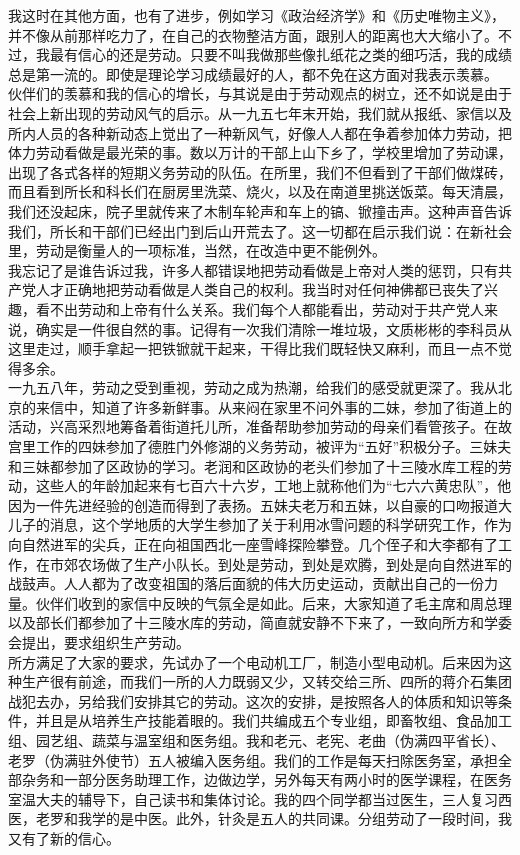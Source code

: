 我这时在其他方面，也有了进步，例如学习《政治经济学》和《历史唯物主义》，并不像从前那样吃力了，在自己的衣物整洁方面，跟别人的距离也大大缩小了。不过，我最有信心的还是劳动。只要不叫我做那些像扎纸花之类的细巧活，我的成绩总是第一流的。即使是理论学习成绩最好的人，都不免在这方面对我表示羡慕。\\

伙伴们的羡慕和我的信心的增长，与其说是由于劳动观点的树立，还不如说是由于社会上新出现的劳动风气的启示。从一九五七年末开始，我们就从报纸、家信以及所内人员的各种新动态上觉出了一种新风气，好像人人都在争着参加体力劳动，把体力劳动看做是最光荣的事。数以万计的干部上山下乡了，学校里增加了劳动课，出现了各式各样的短期义务劳动的队伍。在所里，我们不但看到了干部们做煤砖，而且看到所长和科长们在厨房里洗菜、烧火，以及在南道里挑送饭菜。每天清晨，我们还没起床，院子里就传来了木制车轮声和车上的镐、锨撞击声。这种声音告诉我们，所长和干部们已经出门到后山开荒去了。这一切都在启示我们说：在新社会里，劳动是衡量人的一项标准，当然，在改造中更不能例外。\\

我忘记了是谁告诉过我，许多人都错误地把劳动看做是上帝对人类的惩罚，只有共产党人才正确地把劳动看做是人类自己的权利。我当时对任何神佛都已丧失了兴趣，看不出劳动和上帝有什么关系。我们每个人都能看出，劳动对于共产党人来说，确实是一件很自然的事。记得有一次我们清除一堆垃圾，文质彬彬的李科员从这里走过，顺手拿起一把铁锨就干起来，干得比我们既轻快又麻利，而且一点不觉得多余。\\

一九五八年，劳动之受到重视，劳动之成为热潮，给我们的感受就更深了。我从北京的来信中，知道了许多新鲜事。从来闷在家里不问外事的二妹，参加了街道上的活动，兴高采烈地筹备着街道托儿所，准备帮助参加劳动的母亲们看管孩子。在故宫里工作的四妹参加了德胜门外修湖的义务劳动，被评为“五好”积极分子。三妹夫和三妹都参加了区政协的学习。老润和区政协的老头们参加了十三陵水库工程的劳动，这些人的年龄加起来有七百六十六岁，工地上就称他们为“七六六黄忠队”，他因为一件先进经验的创造而得到了表扬。五妹夫老万和五妹，以自豪的口吻报道大儿子的消息，这个学地质的大学生参加了关于利用冰雪问题的科学研究工作，作为向自然进军的尖兵，正在向祖国西北一座雪峰探险攀登。几个侄子和大李都有了工作，在市郊农场做了生产小队长。到处是劳动，到处是欢腾，到处是向自然进军的战鼓声。人人都为了改变祖国的落后面貌的伟大历史运动，贡献出自己的一份力量。伙伴们收到的家信中反映的气氛全是如此。后来，大家知道了毛主席和周总理以及部长们都参加了十三陵水库的劳动，简直就安静不下来了，一致向所方和学委会提出，要求组织生产劳动。\\

所方满足了大家的要求，先试办了一个电动机工厂，制造小型电动机。后来因为这种生产很有前途，而我们一所的人力既弱又少，又转交给三所、四所的蒋介石集团战犯去办，另给我们安排其它的劳动。这次的安排，是按照各人的体质和知识等条件，并且是从培养生产技能着眼的。我们共编成五个专业组，即畜牧组、食品加工组、园艺组、蔬菜与温室组和医务组。我和老元、老宪、老曲（伪满四平省长）、老罗（伪满驻外使节）五人被编入医务组。我们的工作是每天扫除医务室，承担全部杂务和一部分医务助理工作，边做边学，另外每天有两小时的医学课程，在医务室温大夫的辅导下，自己读书和集体讨论。我的四个同学都当过医生，三人复习西医，老罗和我学的是中医。此外，针灸是五人的共同课。分组劳动了一段时间，我又有了新的信心。\\

